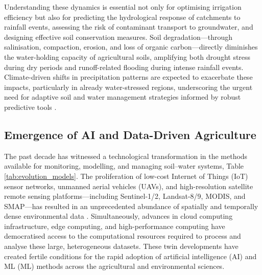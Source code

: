 \documentclass[land,article,submit,pdftex,moreauthors]{Definitions/mdpi}
\numberwithin{equation}{section}
\begin{document}
Understanding these dynamics is essential not only for optimising irrigation efficiency but also for predicting the hydrological response of catchments to rainfall events, assessing the risk of contaminant transport to groundwater, and designing effective soil conservation measures. Soil degradation---through salinisation, compaction, erosion, and loss of organic carbon---directly diminishes the water-holding capacity of agricultural soils, amplifying both drought stress during dry periods and runoff-related flooding during intense rainfall events. Climate-driven shifts in precipitation patterns are expected to exacerbate these impacts, particularly in already water-stressed regions, underscoring the urgent need for adaptive soil and water management strategies informed by robust predictive tools \citep{lehmann2020soil}.

\subsection{Emergence of AI and Data-Driven Agriculture}

The past decade has witnessed a technological transformation in the methods available for monitoring, modelling, and managing soil--water systems, Table \ref{tab:evolution_models}. The proliferation of low-cost Internet of Things (IoT) sensor networks, unmanned aerial vehicles (UAVs), and high-resolution satellite remote sensing platforms---including Sentinel-1/2, Landsat-8/9, MODIS, and SMAP---has resulted in an unprecedented abundance of spatially and temporally dense environmental data \citep{ran2022review}. Simultaneously, advances in cloud computing infrastructure, edge computing, and high-performance computing have democratised access to the computational resources required to process and analyse these large, heterogeneous datasets. These twin developments have created fertile conditions for the rapid adoption of artificial intelligence (AI) and ML (ML) methods across the agricultural and environmental sciences.
\end{document}
